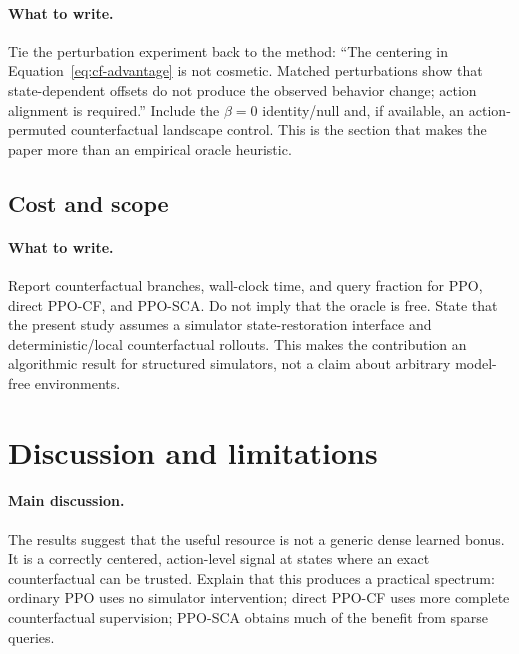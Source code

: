 \documentclass[11pt]{article}
\newcommand{\ppocf}{\textsc{PPO-CF}}
\newcommand{\pposca}{\textsc{PPO-SCA}}
\begin{document}
\paragraph{What to write.}
Tie the perturbation experiment back to the method: ``The centering in
Equation~\eqref{eq:cf-advantage} is not cosmetic. Matched perturbations show
that state-dependent offsets do not produce the observed behavior change;
action alignment is required.'' Include the $\beta=0$ identity/null and, if
available, an action-permuted counterfactual landscape control. This is the
section that makes the paper more than an empirical oracle heuristic.

\subsection{Cost and scope}

\paragraph{What to write.}
Report counterfactual branches, wall-clock time, and query fraction for PPO,
direct \ppocf{}, and \pposca{}. Do not imply that the oracle is free. State that
the present study assumes a simulator state-restoration interface and
deterministic/local counterfactual rollouts. This makes the contribution an
algorithmic result for structured simulators, not a claim about arbitrary
model-free environments.

\section{Discussion and limitations}
\label{sec:discussion}

\paragraph{Main discussion.}
The results suggest that the useful resource is not a generic dense learned
bonus. It is a correctly centered, action-level signal at states where an exact
counterfactual can be trusted. Explain that this produces a practical spectrum:
ordinary PPO uses no simulator intervention; direct \ppocf{} uses more complete
counterfactual supervision; \pposca{} obtains much of the benefit from sparse
queries.
\end{document}
